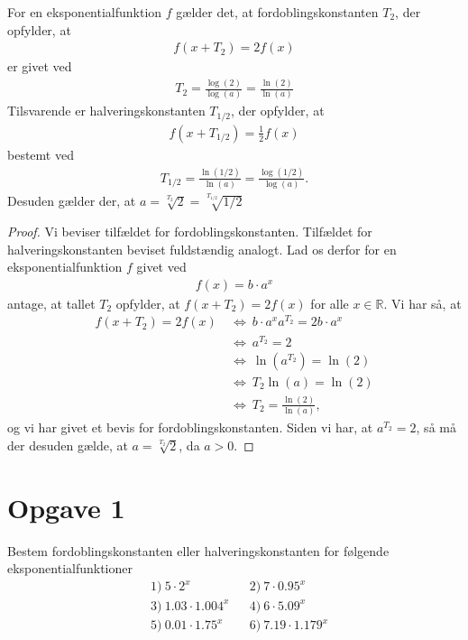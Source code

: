 \documentclass[12pt]{article}
\begin{document}
\begin{setn}
For en eksponentialfunktion $f$ gælder det, at fordoblingskonstanten $T_2$, der opfylder, at
\begin{align*}
f(x+T_2) = 2f(x)
\end{align*}
er givet ved 
\begin{align*}
T_2 = \frac{\log(2)}{\log(a)} = \frac{\ln(2)}{\ln(a)}
\end{align*}
Tilsvarende er halveringskonstanten $T_{1/2}$, der opfylder, at 
\begin{align*}
f(x+T_{1/2}) = \frac{1}{2}f(x)
\end{align*}
bestemt ved
\begin{align*}
T_{1/2} = \frac{\ln(1/2)}{\ln(a)} = \frac{\log(1/2)}{\log(a)}.
\end{align*}
Desuden gælder der, at $a = \sqrt[T_2]{2}= \sqrt[T_{1/2}]{1/2}$
\end{setn}
\begin{proof}
Vi beviser tilfældet for fordoblingskonstanten. Tilfældet for halveringskonstanten beviset fuldstændig analogt. Lad os derfor for en eksponentialfunktion $f$ givet ved
\begin{align*}
f(x) = b\cdot a^x
\end{align*}
antage, at tallet $T_2$ opfylder, at $f(x+T_2) = 2f(x)$ for alle $x\in \mathbb{R}$. Vi har så, at 
\begin{align*}
f(x+T_2) = 2f(x) \ &\Leftrightarrow \ b\cdot a^{x}a^{T_2}=2b\cdot a^x\\
&\Leftrightarrow\ a^{T_2} = 2\\
&\Leftrightarrow\ \ln(a^{T_2}) = \ln(2)\\
&\Leftrightarrow\ T_2\ln(a) = \ln(2)\\
&\Leftrightarrow\ T_2 = \frac{\ln(2)}{\ln(a)},
\end{align*}
og vi har givet et bevis for fordoblingskonstanten. Siden vi har, at $a^{T_2} = 2$, så må der desuden gælde, at $a=\sqrt[T_2]{2}$, da $a>0$. 
\end{proof}
\section*{Opgave 1}
Bestem fordoblingskonstanten eller halveringskonstanten for følgende eksponentialfunktioner
\begin{align*}
	&1) \ 5\cdot 2^x   &&2) \ 7\cdot 0.95^x   \\
	&3) \ 1.03\cdot 1.004^x   &&4) \ 6\cdot 5.09^x   \\
	&5) \ 0.01\cdot 1.75^x   &&6) \ 7.19\cdot 1.179^x   \\		
\end{align*}
\end{document}
